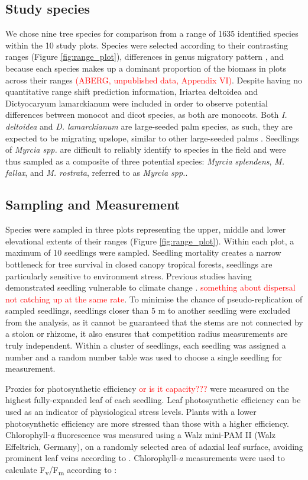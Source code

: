 \documentclass[a4paper,11pt]{article}
\newcommand{\todo}[1]{\textcolor{red}{#1}}   %
\begin{document}
\subsection*{Study species} 
We chose nine tree species for comparison from a range of 1635 identified species within the 10 study plots. Species were selected according to their contrasting ranges (Figure \ref{fig:range_plot}), differences in genus migratory pattern \citep{Feeley2011}, and because each species makes up a dominant proportion of the biomass in plots across their ranges \todo{(ABERG, unpublished data, Appendix VI)}. Despite having no quantitative range shift prediction information, Iriartea deltoidea and Dictyocaryum lamarckianum were included in order to observe potential differences between monocot and dicot species, as both are monocots. Both \textit{I. deltoidea} and \textit{D. lamarckianum} are large-seeded palm species, as such, they are expected to be migrating upslope, similar to other large-seeded palms \citep{Hillyer2010}. Seedlings of \textit{Myrcia spp.} are difficult to reliably identify to species in the field and were thus sampled as a composite of three potential species: \textit{Myrcia splendens}, \textit{M. fallax}, and \textit{M. rostrata}, referred to as \textit{Myrcia spp.}. 

\subsection*{Sampling and Measurement}
Species were sampled in three plots representing the upper, middle and lower elevational extents of their ranges (Figure \ref{fig:range_plot}). Within each plot, a maximum of 10 seedlings were sampled. Seedling mortality creates a narrow bottleneck for tree survival in closed canopy tropical forests, seedlings are particularly sensitive to environment stress. Previous studies having demonstrated seedling vulnerable to climate change \citep{REF}. \todo{something about dispersal not catching up at the same rate}. To minimise the chance of pseudo-replication of sampled seedlings, seedlings closer than 5 m to another seedling were excluded from the analysis, as it cannot be guaranteed that the stems are not connected by a stolon or rhizome, it also ensures that competition radius measurements are truly independent. Within a cluster of seedlings, each seedling was assigned a number and a random number table was used to choose a single seedling for measurement.

Proxies for photosynthetic efficiency \todo{or is it capacity???} were measured on the highest fully-expanded leaf of each seedling. Leaf photosynthetic efficiency can be used as an indicator of physiological stress levels. Plants with a lower photosynthetic efficiency are more stressed than those with a higher efficiency. Chlorophyll-\textit{a} fluorescence was measured using a Walz mini-PAM II (Walz Effeltrich, Germany), on a randomly selected area of adaxial leaf surface, avoiding prominent leaf veins according to \citep{}. Chlorophyll-\textit{a} measurements were used to calculate F\textsubscript{v}/F\textsubscript{m} according to \citet{Genty1989}:
\end{document}
